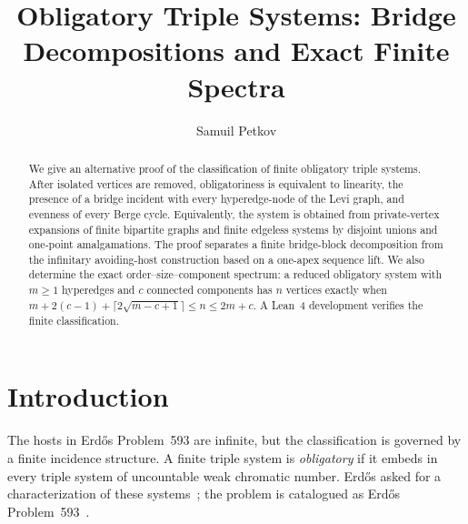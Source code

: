 
\title[Obligatory triple systems]
  {Obligatory Triple Systems: Bridge Decompositions and Exact Finite Spectra}
\author{Samuil Petkov}
\address{École normale supérieure--PSL, 45 rue d'Ulm, 75005 Paris, France}

\begin{abstract}
We give an alternative proof of the classification of finite obligatory triple
systems.  After isolated vertices are removed, obligatoriness is equivalent to
linearity, the presence of a bridge incident with every hyperedge-node of the
Levi graph, and evenness of every Berge cycle.  Equivalently, the system is
obtained from private-vertex expansions of finite bipartite graphs and finite
edgeless systems by disjoint unions and one-point amalgamations.  The proof
separates a finite bridge-block decomposition from the infinitary avoiding-host
construction based on a one-apex sequence lift.  We also determine the exact
order--size--component spectrum: a reduced obligatory system with $m\ge1$
hyperedges and $c$ connected components has $n$ vertices exactly when
$m+2(c-1)+\lceil2\sqrt{m-c+1}\rceil\le n\le2m+c$.  A Lean~4 development verifies
the finite classification.
\end{abstract}

\maketitle

\section{Introduction}\label{introduction-ams}

The hosts in Erdős Problem~593 are infinite, but the classification is governed
by a finite incidence structure.  A finite triple system is \emph{obligatory}
if it embeds in every triple system of uncountable weak chromatic number.
Erdős asked for a characterization of these systems~\citep{erdos1995}; the
problem is catalogued as Erdős Problem~593~\citep{bloom593}.

